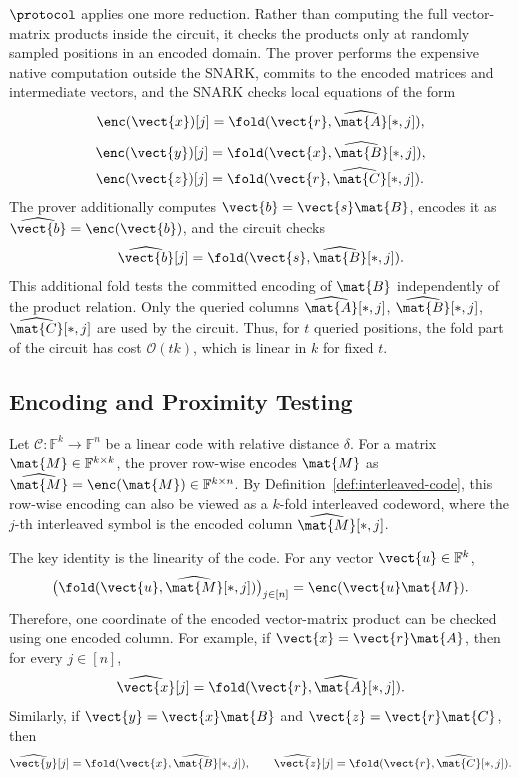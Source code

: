 \(\protocol\) applies one more reduction.  Rather than computing the full
vector-matrix products inside the circuit, it checks the products only at
randomly sampled positions in an encoded domain.  The prover performs the
expensive native computation outside the SNARK, commits to the encoded
matrices and intermediate vectors, and the SNARK checks local equations of the
form
\[
  \enc(\vect{x})[j]
  =
  \fold(\vect{r},\widehat{\mat{A}}[*,j]),
\]
\[
\begin{aligned}
  \enc(\vect{y})[j]
  &=
  \fold(\vect{x},\widehat{\mat{B}}[*,j]),\\
  \enc(\vect{z})[j]
  &=
  \fold(\vect{r},\widehat{\mat{C}}[*,j]).
\end{aligned}
\]
The prover additionally computes \(\vect{b}=\vect{s}\mat{B}\), encodes it as
\(\widehat{\vect{b}}=\enc(\vect{b})\), and the circuit checks
\[
  \widehat{\vect{b}}[j]
  =
  \fold(\vect{s},\widehat{\mat{B}}[*,j]).
\]
This additional fold tests the committed encoding of \(\mat{B}\) independently
of the product relation.
Only the queried columns
\(\widehat{\mat{A}}[*,j]\), \(\widehat{\mat{B}}[*,j]\),
\(\widehat{\mat{C}}[*,j]\) are used by the circuit.  Thus, for \(t\) queried
positions, the fold part of the circuit has cost \(\mathcal{O}(tk)\), which is
linear in \(k\) for fixed \(t\).

\subsection{Encoding and Proximity Testing}
\label{sec:overview-encoding}

Let \(\mathcal{C}:\mathbb{F}^k\to\mathbb{F}^n\) be a linear code
with relative distance \(\delta\).  For a matrix
\(\mat{M}\in\mathbb{F}^{k\times k}\), the prover row-wise encodes \(\mat{M}\)
as $\widehat{\mat{M}}=\enc(\mat{M})\in\mathbb{F}^{k\times n}$.
By Definition~\ref{def:interleaved-code}, this row-wise encoding can also be
viewed as a \(k\)-fold interleaved codeword, where the \(j\)-th interleaved
symbol is the encoded column \(\widehat{\mat{M}}[*,j]\).

The key identity is the linearity of the code.  For any vector
\(\vect{u}\in\mathbb{F}^k\),
\[
  \big(
    \fold(\vect{u},\widehat{\mat{M}}[*,j])
  \big)_{j\in[n]}
  =
  \enc(\vect{u}\mat{M}).
\]
Therefore, one coordinate of the encoded vector-matrix product can be checked
using one encoded column.  For example, if
\(\vect{x}=\vect{r}\mat{A}\), then for every \(j\in[n]\),
\[
  \widehat{\vect{x}}[j]
  =
  \fold(\vect{r},\widehat{\mat{A}}[*,j]).
\]
Similarly, if \(\vect{y}=\vect{x}\mat{B}\) and
\(\vect{z}=\vect{r}\mat{C}\), then
\[
  \widehat{\vect{y}}[j]
  =
  \fold(\vect{x},\widehat{\mat{B}}[*,j]),
  \qquad
  \widehat{\vect{z}}[j]
  =
  \fold(\vect{r},\widehat{\mat{C}}[*,j]).
\]

